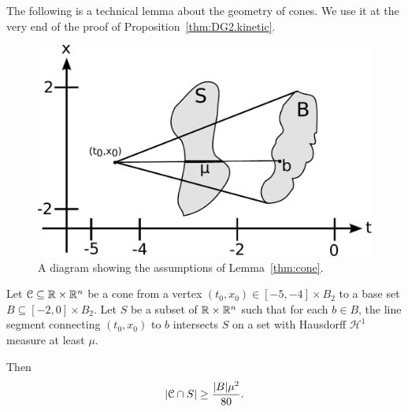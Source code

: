 The following is a technical lemma about the geometry of cones.  We use it at the very end of the proof of Proposition~\ref{thm:DG2.kinetic}.  

\begin{figure}[h]
\includegraphics[width=.5 \textwidth]{NFP-diagram-Cone}
\caption{A diagram showing the assumptions of Lemma~\ref{thm:cone}.}
\end{figure}

\begin{lemma}\label{thm:cone}
Let $\mathcal{C} \subseteq \mathbb{R} \times \mathbb{R}^n$ be a cone from a vertex $(t_0,x_0) \in [-5, -4] \times B_2$ to a base set $B \subseteq [-2,0]\times B_2$.  %
Let $S$ be a subset of $\mathbb{R}\times\mathbb{R}^n$ such that for each $b \in B$, the line segment connecting $(t_0,x_0)$ to $b$ intersects $S$ on a set with Hausdorff $\mathcal{H}^1$ measure at least $\mu$.  

Then 
\[ \left\lvert \mathcal{C} \cap S \right\rvert \geq \frac{ |B| \mu^2}{80}. \]
\end{lemma}

